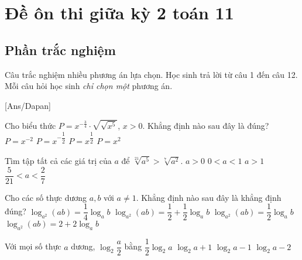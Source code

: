 \section{Đề ôn thi giữa kỳ 2 toán 11}
\subsection{Phần trắc nghiệm}
Câu trắc nghiệm nhiều phương án lựa chọn. Học sinh trả lời từ
câu 1 đến câu 12. Mỗi câu hỏi học sinh \textit{chỉ chọn một} phương án.

[Ans/Dapan]

\hienthiloigiaiex
\begin{ex}%
	Cho biểu thức $P=x^{-\tfrac{3}{4}}\cdot \sqrt{\sqrt{x^5}}$, $x > 0$. Khẳng định nào sau đây là đúng?
	\choice
	{$P=x^{-2}$}
	{$P=x^{-\dfrac{1}{2}}$}
	{\True $P=x^{\dfrac{1}{2}}$}
	{$P=x^2$}
\end{ex}
\begin{ex}%
	Tìm tập tất cả các giá trị của $a$ để $\sqrt[{21}]{a^5} > \sqrt[{7}]{a^2}$.
	\choice
	{$a > 0$}
	{\True $0< a < 1$}
	{$a > 1$}
	{$\dfrac{5}{21} < a < \dfrac{2}{7}$}
\end{ex}
\begin{ex}%
	Cho các số thực dương $a,b$ với $a\ne 1$. Khẳng định nào sau đây là khẳng định đúng?
	\choice
	{$\log _{a^2} (ab)=\dfrac{1}{4} \log_a b$}
	{\True $\log _{a^2} (ab)=\dfrac{1}{2}+\dfrac{1}{2} \log_a b$}
	{$\log _{a^2} (ab)=\dfrac{1}{2} \log_a b$}
	{$\log _{a^2} (ab)=2+2\log_a b$}
\end{ex}
\begin{ex}%
	Với mọi số thực $a$ dương, $\log_2 \dfrac{a}{2}$ bằng
	\choice
	{$\dfrac{1}{2} \log_2 a$}
	{$\log_2 a+1$}
	{\True $\log_2 a-1$}
	{$\log_2 a-2$}
\end{ex}
